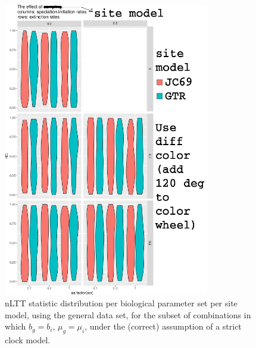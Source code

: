 \documentclass{article}
\begin{document}
\begin{figure}[!htbp]
  \includegraphics[width=0.8\textwidth]{fig_site_model.png}
  \caption{
    nLTT statistic distribution per biological parameter set per site model,
    using the general data set, 
    for the subset of combinations in which $b_g = b_i$, $\mu_g = \mu_i$, 
    under the (correct) assumption of a strict clock model.
  }
\end{figure}
\end{document}

